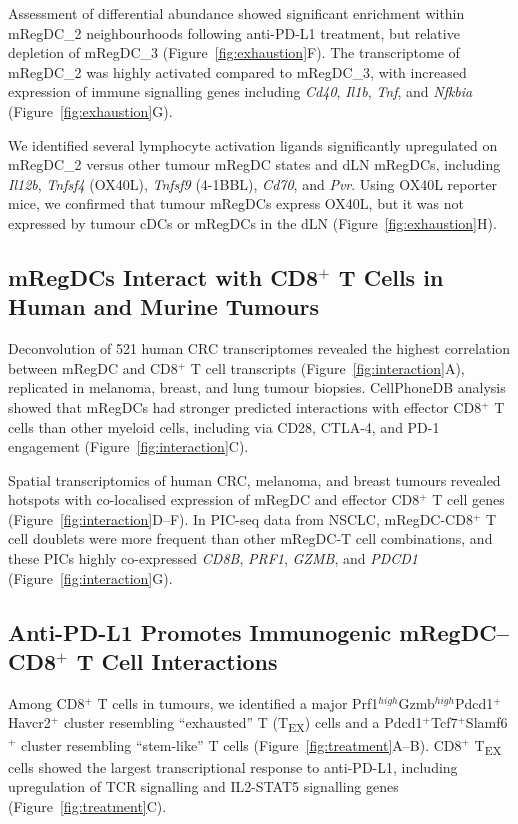 \documentclass[11pt]{article}
\begin{document}
Assessment of differential abundance showed significant enrichment within mRegDC\_2 neighbourhoods following anti-PD-L1 treatment, but relative depletion of mRegDC\_3 (Figure~\ref{fig:exhaustion}F). The transcriptome of mRegDC\_2 was highly activated compared to mRegDC\_3, with increased expression of immune signalling genes including \textit{Cd40}, \textit{Il1b}, \textit{Tnf}, and \textit{Nfkbia} (Figure~\ref{fig:exhaustion}G).

We identified several lymphocyte activation ligands significantly upregulated on mRegDC\_2 versus other tumour mRegDC states and dLN mRegDCs, including \textit{Il12b}, \textit{Tnfsf4} (OX40L), \textit{Tnfsf9} (4-1BBL), \textit{Cd70}, and \textit{Pvr}. Using OX40L reporter mice, we confirmed that tumour mRegDCs express OX40L, but it was not expressed by tumour cDCs or mRegDCs in the dLN (Figure~\ref{fig:exhaustion}H).

\subsection{mRegDCs Interact with CD8$^+$ T Cells in Human and Murine Tumours}

Deconvolution of 521 human CRC transcriptomes revealed the highest correlation between mRegDC and CD8$^+$ T cell transcripts (Figure~\ref{fig:interaction}A), replicated in melanoma, breast, and lung tumour biopsies. CellPhoneDB analysis showed that mRegDCs had stronger predicted interactions with effector CD8$^+$ T cells than other myeloid cells, including via CD28, CTLA-4, and PD-1 engagement (Figure~\ref{fig:interaction}C).

Spatial transcriptomics of human CRC, melanoma, and breast tumours revealed hotspots with co-localised expression of mRegDC and effector CD8$^+$ T cell genes (Figure~\ref{fig:interaction}D--F). In PIC-seq data from NSCLC, mRegDC-CD8$^+$ T cell doublets were more frequent than other mRegDC-T cell combinations, and these PICs highly co-expressed \textit{CD8B}, \textit{PRF1}, \textit{GZMB}, and \textit{PDCD1} (Figure~\ref{fig:interaction}G).

\subsection{Anti-PD-L1 Promotes Immunogenic mRegDC--CD8$^+$ T Cell Interactions}

Among CD8$^+$ T cells in tumours, we identified a major Prf1$^{high}$Gzmb$^{high}$Pdcd1$^+$Havcr2$^+$ cluster resembling ``exhausted'' T (T\textsubscript{EX}) cells and a Pdcd1$^+$Tcf7$^+$Slamf6$^+$ cluster resembling ``stem-like'' T cells (Figure~\ref{fig:treatment}A--B). CD8$^+$ T\textsubscript{EX} cells showed the largest transcriptional response to anti-PD-L1, including upregulation of TCR signalling and IL2-STAT5 signalling genes (Figure~\ref{fig:treatment}C).
\end{document}
